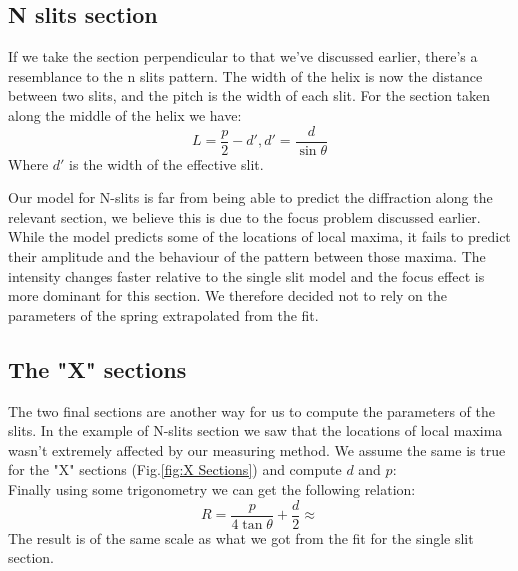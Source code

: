 \subsection{N slits section}
If we take the section perpendicular to that we've discussed earlier, there's a resemblance to the n slits pattern.
The width of the helix is now the distance between two slits, and the pitch is the width of each slit.
For the section taken along the middle of the helix we have: \[L=\frac{p}{2}-d',d'=\frac{d}{\sin \theta}\]
Where $d'$ is the width of the effective slit.

Our model for N-slits is far from being able to predict the diffraction along the relevant section, we believe this is due to the focus problem discussed earlier.
While the model predicts some of the locations of local maxima, it fails to predict their amplitude and the behaviour of the pattern between those maxima.
The intensity changes faster relative to the single slit model and the focus effect is more dominant for this section.
We therefore decided not to rely on the parameters of the spring extrapolated from the fit.

\subsection{The "X" sections}
The two final sections are another way for us to compute the parameters of the slits.
In the example of N-slits section we saw that the locations of local maxima wasn't extremely affected by our measuring method.
We assume the same is true for the "X" sections (Fig.\ref{fig:X Sections}) and compute $d$ and $p$:
\[\]
Finally using some trigonometry we can get the following relation:
\[R=\frac{p}{4\tan \theta}+\frac{d}{2}\approx \]
The result is of the same scale as what we got from the fit for the single slit section.
